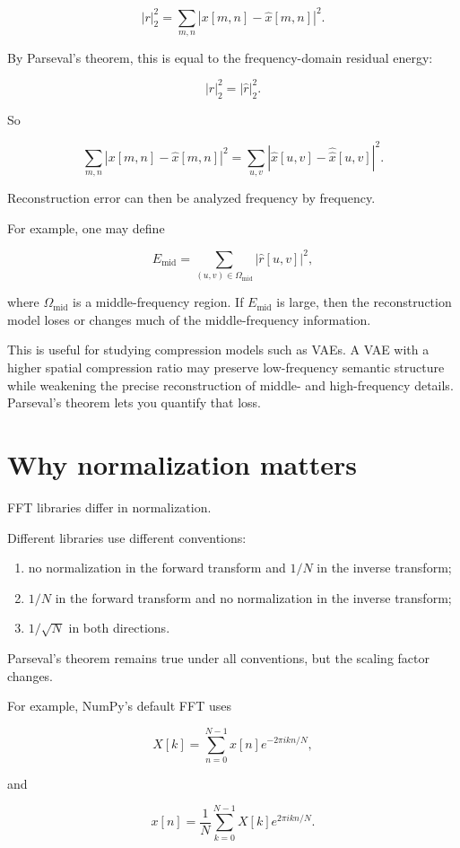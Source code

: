 \[
|r|_2^2
=
\sum_{m,n}
|x[m,n]-\hat{x}[m,n]|^2.
\]

By Parseval’s theorem, this is equal to the frequency-domain residual energy:

\[
|r|_2^2
=
|\widehat{r}|_2^2.
\]

So

\[
\sum_{m,n}
|x[m,n]-\hat{x}[m,n]|^2
=
\sum_{u,v}
|\widehat{x}[u,v]-\widehat{\hat{x}}[u,v]|^2.
\]

Reconstruction error can then be analyzed frequency by frequency.

For example, one may define

\[
E_{\mathrm{mid}}
=
\sum_{(u,v)\in \Omega_{\mathrm{mid}}}
|\widehat{r}[u,v]|^2,
\]

where \(\Omega_{\mathrm{mid}}\) is a middle-frequency region. If \(E_{\mathrm{mid}}\) is large, then the reconstruction model loses or changes much of the middle-frequency information.

This is useful for studying compression models such as VAEs. A VAE with a higher spatial compression ratio may preserve low-frequency semantic structure while weakening the precise reconstruction of middle- and high-frequency details. Parseval’s theorem lets you quantify that loss.

\section{Why normalization matters}

FFT libraries differ in normalization.

Different libraries use different conventions:

\begin{enumerate}
  \item no normalization in the forward transform and \(1/N\) in the inverse transform;
  \item \(1/N\) in the forward transform and no normalization in the inverse transform;
  \item \(1/\sqrt{N}\) in both directions.
\end{enumerate}

Parseval’s theorem remains true under all conventions, but the scaling factor changes.

For example, NumPy’s default FFT uses

\[
X[k]
=
\sum_{n=0}^{N-1}
x[n]e^{-2\pi i kn/N},
\]

and

\[
x[n]
=
\frac{1}{N}
\sum_{k=0}^{N-1}
X[k]e^{2\pi i kn/N}.
\]

